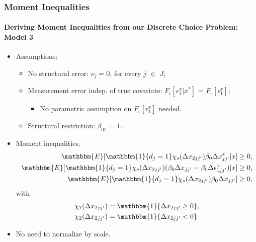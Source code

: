 \documentclass[10pt,letterpaper]{beamer}
\begin{document}
\begin{frame}
\frametitle{Moment Inequalities}
\framesubtitle{Deriving Moment Inequalities from our Discrete Choice Problem: Model 3}

\begin{itemize}
	\item Assumptions:
	\begin{itemize}
		\item No structural error: $\nu_{j} = 0$, for every $j$ $\in$ $J$;
		\item Measurement error indep. of true covariate: $F_{\epsilon}[\epsilon^{x}_{1}|x^{*}]$ = $F_{\epsilon}[\epsilon^{x}_{1}]$;
		\begin{itemize}
			\item No parametric assumption on $F_{\epsilon}[\epsilon^{x}_{1}]$ needed.
		\end{itemize}
		\item Structural restriction: $\beta_{01}$ = $1$.
	\end{itemize}
	\item Moment inequalities. 
	\begin{align*}
	\mathbbm{E}[\mathbbm{1}\{d_{j}=1\}\chi_{s}(\Delta x_{2jj'})\beta_{0}\Delta x^{*}_{jj'}|x]&\geq 0,\\
	\mathbbm{E}[\mathbbm{1}\{d_{j}=1\}\chi_{s}(\Delta x_{2jj'})(\beta_{0}\Delta x_{jj'}-\beta_{0}\Delta \epsilon^{x}_{1jj'})|x]&\geq 0,\\
	\mathbbm{E}[\mathbbm{1}\{d_{j}=1\}\chi_{s}(\Delta x_{2jj'})\beta_{0}\Delta x_{jj'}]&\geq 0,
	\end{align*}
	with
	\begin{align*}
	\chi_{1}(\Delta x_{2jj'}) &= \mathbbm{1}\{\Delta x_{2jj'}\geq 0\},\\
	\chi_{2}(\Delta x_{2jj'}) &= \mathbbm{1}\{\Delta x_{2jj'}<0\}
	\end{align*}
	\item No need to normalize by scale.
\end{itemize}
\end{frame}
\end{document}
